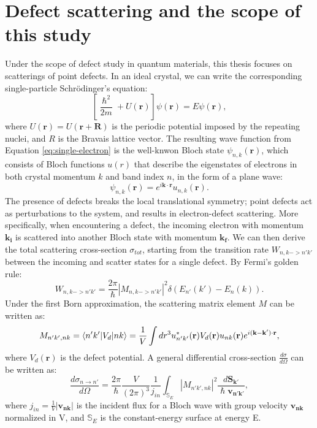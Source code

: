 \section{Defect scattering and the scope of this study}
Under the scope of defect study in quantum materials, this thesis focuses on scatterings of point defects. In an ideal crystal, we can write the corresponding single-particle Schr\"{o}dinger's equation: 
\begin{equation}
	\label{eq:single-electron}
	\left[\frac{\hslash^2}{2m}+U(\mathbf{r})\right]\psi(\mathbf{r}) = E\psi(\mathbf{r}),
\end{equation}
where $U(\mathbf{r})=U(\mathbf{r}+\mathbf{R})$ is the periodic potential imposed by the repeating nuclei, and $R$ is the Bravais lattice vector. 
The resulting wave function from Equation \ref{eq:single-electron} is the well-knwon Bloch state $\psi_{n,k}(\mathbf{r})$, which consists of Bloch functions $u(r)$ that describe the eigenstates of electrons in both crystal momentum $k$ and band index $n$, in the form of a plane wave: 
\begin{equation}
	\psi_{n,k}(\mathbf{r}) = e^{i\mathbf{k}\cdot \mathbf{r}}u_{n,k}(\mathbf{r}).
\end{equation}
The presence of defects breaks the local translational symmetry; point defects act as perturbations to the system, and results in electron-defect scattering. More specifically, when encountering a defect, the incoming electron with momentum $\mathbf{k_i}$ is scattered into another Bloch state with momentum $\mathbf{k_f}$. We can then derive the total scattering cross-section $\sigma_{tot}$, starting from the transition rate $W_{n,k->n'k'}$ between the incoming and scatter states for a single defect. By Fermi's golden rule:
\begin{equation}
	W_{n,k->n'k'} = \frac{2\pi}{\hslash}|M_{n,k->n'k'}|^2\delta(E_{n'}(k')-E_{n}(k)). 
\end{equation}
Under the first Born approximation, the scattering matrix element $M$ can be written as:  
\begin{equation}
	M_{n'k',nk} = \braket{n'k'|V_d|nk} = \frac{1}{V}\int dr^3 \space u_{n'k'}^{*}(\mathbf{r}) V_d(\mathbf{r}) u_{nk}(\mathbf{r})e^{i(\mathbf{k}-\mathbf{k'})\cdot \mathbf{r}},
\end{equation} 
where $V_d(\mathbf{r})$ is the defect potential. A general differential cross-section $\frac{d\sigma}{d\Omega}$ can be written as: 
\begin{equation}
	\label{eq:differential_cross_section}
	\frac{d\sigma_{n\rightarrow n'}}{d\Omega} = \frac{2\pi}{\hslash} \frac{V}{(2\pi)^3}\frac{1}{j_{in}}\int_{\mathbb{S}_E}|M_{n'k',nk}|^2\frac{d\mathbf{S_{k'}}}{\hslash \mathbf{v_{n'k'}}},
\end{equation}
where $j_{in} = \frac{1}{V}|\mathbf{v_{nk}}|$ is the incident flux for a Bloch wave with group velocity $\mathbf{v_{nk}}$ normalized in V, and $\mathbb{S}_E$ is the constant-energy surface at energy E. 

